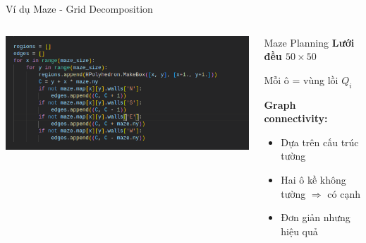 \documentclass[aspectratio=169]{beamer}
\begin{document}
\begin{frame}{Ví dụ Maze - Grid Decomposition}
    \begin{columns}[c]
        \includegraphics[width=\textwidth]{imgs/maze-decompose.png}

        \begin{block}{Maze Planning}
            \small
            \textbf{Lưới đều $50 \times 50$}

            \vspace{0.3cm}
            Mỗi ô = vùng lồi $Q_i$

            \vspace{0.3cm}
            \textbf{Graph connectivity:}
            \begin{itemize}
                \item Dựa trên cấu trúc tường
                \item Hai ô kề không tường $\Rightarrow$ có cạnh
                \item Đơn giản nhưng hiệu quả
            \end{itemize}
        \end{block}
    \end{columns}
\end{frame}
\end{document}
